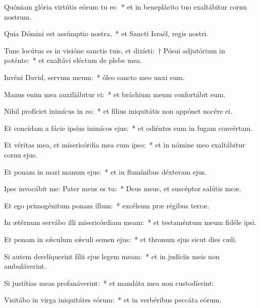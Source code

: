 \item Quóniam glória virtútis eórum tu es:~* et in beneplácito tuo exaltábitur cornu nostrum.

\item Quia Dómini est assúmptio nostra,~* et Sancti Israël, regis nostri.

\item Tunc locútus es in visióne sanctis tuis, et dixísti:~† Pósui adjutórium in poténte:~* et exaltávi eléctum de plebe mea.

\item Invéni David, servum meum:~* óleo sancto meo unxi eum.

\item Manus enim mea auxiliábitur ei:~* et bráchium meum confortábit eum.

\item Nihil profíciet inimícus in eo:~* et fílius iniquitátis non appónet nocére ei.

\item Et concídam a fácie ipsíus inimícos ejus:~* et odiéntes eum in fugam convértam.

\item Et véritas mea, et misericórdia mea cum ipso:~* et in nómine meo exaltábitur cornu ejus.

\item Et ponam in mari manum ejus:~* et in flumínibus déxteram ejus.

\item Ipse invocábit me: Pater meus es tu:~* Deus meus, et suscéptor salútis meæ.

\item Et ego primogénitum ponam illum:~* excélsum præ régibus terræ.

\item In ætérnum servábo illi misericórdiam meam:~* et testaméntum meum fidéle ipsi.

\item Et ponam in sǽculum sǽculi semen ejus:~* et thronum ejus sicut dies cæli.

\item Si autem derelíquerint fílii ejus legem meam:~* et in judíciis meis non ambuláverint.

\item Si justítias meas profanáverint:~* et mandáta mea non custodíerint:

\item Visitábo in virga iniquitátes eórum:~* et in verbéribus peccáta eórum.

